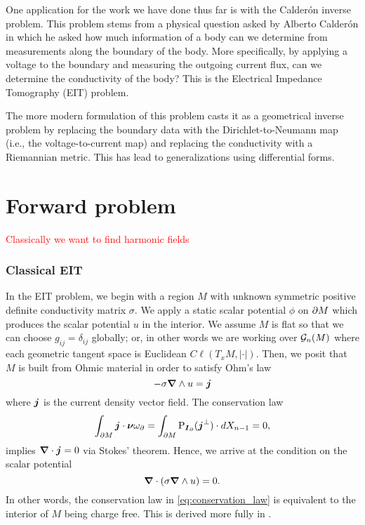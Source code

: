 One application for the work we have done thus far is with the Calder\'on inverse problem. This problem stems from a physical question asked by Alberto Calder\'on in which he asked how much information of a body can we determine from measurements along the boundary of the body. More specifically, by applying a voltage to the boundary and measuring the outgoing current flux, can we determine the conductivity of the body? This is the Electrical Impedance Tomography (EIT) problem.

The more modern formulation of this problem casts it as a geometrical inverse problem by replacing the boundary data with the Dirichlet-to-Neumann map (i.e., the voltage-to-current map) and replacing the conductivity with a Riemannian metric. This has lead to generalizations using differential forms. 


\section{Forward problem}

\textcolor{red}{Classically we want to find harmonic fields}

\subsubsection{Classical EIT}
In the EIT problem, we begin with a region $M$ with unknown symmetric positive definite conductivity matrix $\sigma$. We apply a static scalar potential $\phi$ on ${\partial M}$ which produces the scalar potential $u$ in the interior. We assume $M$ is flat so that we can choose $g_{ij}=\delta_{ij}$ globally; or, in other words we are working over $\mathcal{G}_n(M)$ where each geometric tangent space is Euclidean $C\ell(T_xM, |\cdot|)$. Then, we posit that $M$ is built from Ohmic material in order to satisfy Ohm's law 
\begin{equation}
\label{eq:ohms_law}
-\sigma \boldsymbol{\nabla} \wedge u= \boldsymbol{j}
\end{equation}
where $\boldsymbol{j}$ is the current density vector field. The conservation law
\begin{equation}
\label{eq:conservation_law}
\int_{{\partial M}} \boldsymbol{j} \cdot \boldsymbol{\nu} \omega_\partial = \int_{{\partial M}} \operatorname{P}_{\boldsymbol{I}_\partial}(\boldsymbol{j}^\perp) \cdot dX_{n-1} = 0,
\end{equation}
implies $\boldsymbol{\nabla} \cdot \boldsymbol{j}= 0$ via Stokes' theorem. Hence, we arrive at the condition on the scalar potential
\begin{equation}
\boldsymbol{\nabla} \cdot (\sigma \boldsymbol{\nabla} \wedge u) = 0.
\end{equation} 
In other words, the conservation law in \cref{eq:conservation_law} is equivalent to the interior of $M$ being charge free. This is derived more fully in \cite{feldman_calderproblem_nodate}. 

